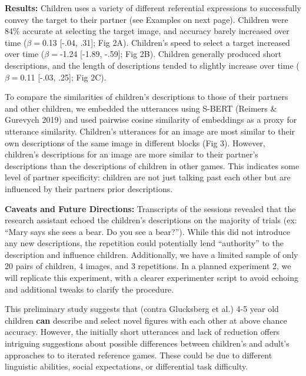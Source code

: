 \documentclass[11pt,a4paper]{article}
\begin{document}
\textbf{Results:} 
Children uses a variety of different referential expressions to successfully convey the target to their partner (see Examples on next page). Children were 84\% accurate at selecting the target image, and accuracy barely increased over time ($\beta=$0.13 [-.04, .31]; Fig 2A). Children's speed to select a target increased over time ($\beta=$-1.24 [-1.89, -.59]; Fig 2B). Children generally produced short descriptions, and the length of descriptions tended to slightly increase over time ($\beta=$0.11 [-.03, .25]; Fig 2C). 

To compare the similarities of children's descriptions to those of their partners and other children, we embedded the utterances using S-BERT (Reimers \& Gurevych 2019) and used pairwise cosine similarity of embeddings as a proxy for utterance similarity. Children's utterances for an image are most similar to their own descriptions of the same image in different blocks (Fig 3). However, children's descriptions for an image are more similar to their partner's descriptions than the descriptions of children in other games. This indicates some level of partner specificity: children are not just talking past each other but are influenced by their partners prior descriptions.

\textbf{Caveats and Future Directions:} 
Transcripts of the sessions revealed that the research assistant echoed the children's descriptions on the majority of trials (ex: ``Mary says she sees a bear. Do you see a bear?''). While this did not introduce any new descriptions, the repetition could potentially lend ``authority'' to the description and influence children. Additionally, we have a limited sample of only 20 pairs of children, 4 images, and 3 repetitions. In a planned experiment 2, we will replicate this experiment, with a clearer experimenter script to avoid echoing and additional tweaks to clarify the procedure. 

This preliminary study suggests that (contra Glucksberg et al.) 4-5 year old children \textbf{can} describe and select novel figures with each other at above chance accuracy. However, the initially short utterances and lack of reduction offers intriguing suggestions about possible differences between children's and adult's approaches to to iterated reference games. These could be due to different linguistic abilities, social expectations, or differential task difficulty. 
\newpage
\end{document}
